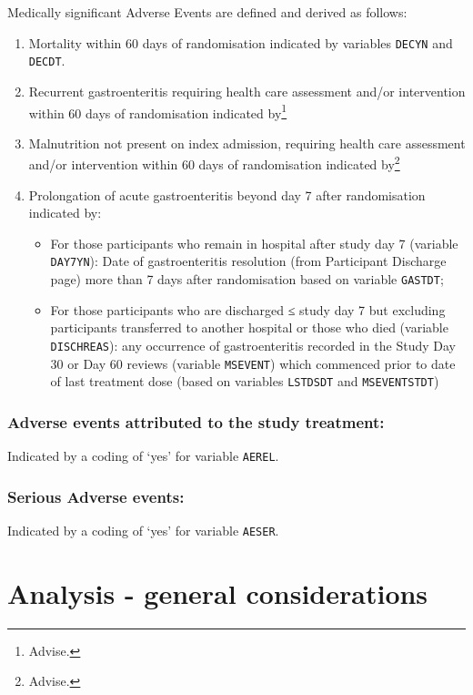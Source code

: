 \documentclass[a4paper]{article}
\begin{document}
Medically significant Adverse Events are defined and derived as follows:

\begin{enumerate}
    \item Mortality within 60 days of randomisation indicated by variables \texttt{DECYN} and \texttt{DECDT}.
    \item Recurrent gastroenteritis requiring health care assessment and/or intervention within 60 days of randomisation indicated by\footnote{Advise.}
    \item Malnutrition not present on index admission, requiring health care assessment and/or intervention within 60 days of randomisation indicated by\footnote{Advise.}
    \item Prolongation of acute gastroenteritis beyond day 7 after randomisation indicated by:
    \begin{itemize}
        \item For those participants who remain in hospital after study day 7 (variable \texttt{DAY7YN}): Date of gastroenteritis resolution (from Participant Discharge page) more than 7 days after randomisation based on variable \texttt{GASTDT}; 
        \item For those participants who are discharged ≤ study day 7 but excluding participants transferred to another hospital or those who died (variable \texttt{DISCHREAS}): any occurrence of gastroenteritis recorded in the Study Day 30 or Day 60 reviews (variable \texttt{MSEVENT}) which commenced prior to date of last treatment dose (based on variables \texttt{LSTDSDT} and \texttt{MSEVENTSTDT})
    \end{itemize}
\end{enumerate}


\subsubsection{Adverse events attributed to the study treatment:}

Indicated by a coding of `yes' for variable \texttt{AEREL}. 

\subsubsection{Serious Adverse events:}

Indicated by a coding of `yes' for variable \texttt{AESER}.


\section{Analysis - general considerations}
\end{document}
